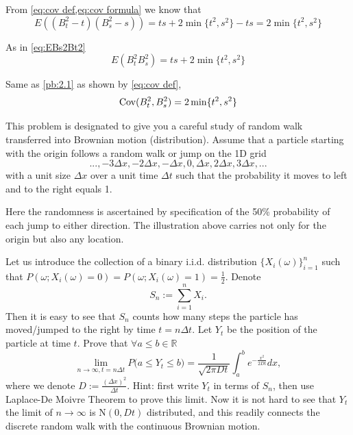     \begin{subproblem}
        \item\label{pb:2.1}
        From \cref{eq:cov def,eq:cov formula} we know that
        \[E\left((B_t^2-t)(B_s^2-s)\right)=ts+2\min\{t^2,s^2\}-ts=2\min\{t^2,s^2\}\]

        \item
        As in \cref{eq:EBs2Bt2}
        \[E\left(B_t^2B_s^2\right)=ts+2\min\{t^2,s^2\}\]

        \item
        Same as \ref{pb:2.1} as shown by \cref{eq:cov def},
        \[\mathrm{Cov}(B_t^2,B_s^2)=2\min\{t^2,s^2\}\]
    \end{subproblem}

    \problem
    \begin{question}
        This problem is designated to give you a careful study of random walk
        transferred into Brownian motion (distribution).  Assume that a particle
        starting with the origin follows a random walk or jump on the 1D grid 
        \[...,-3\Delta x, -2\Delta x, -\Delta x, 0,\Delta x,2\Delta x,3\Delta x,...\]
        with a unit size $\Delta x$ over a unit time $\Delta t$ such that 
        the probability it moves to left and to the right equals 1.
        
        Here the randomness is ascertained by specification of
        the 50\% probability of each jump to either direction. 
        The illustration above carries not only for the origin but also any location.


        Let us introduce the collection of a binary i.i.d. distribution
        $\{X_i(\omega)\}_{i=1}^n$ such that
        $P(\omega;X_i(\omega)=0)=P(\omega;X_i(\omega)=1)=\frac{1}{2}$.  Denote
        \[S_n:=\sum_{i=1}^n X_i.\]
        Then it is easy to see that $S_n$ counts how many steps
        the particle has moved/jumped to the right by time $t=n\Delta t$.
         Let $Y_t$ be the position of the particle at time $t$. 
         Prove that $\forall a\leq b\in\mathbb R$
        \[\lim_{n\rightarrow \infty, t=n\Delta t}P\big(a\leq Y_t\leq b\big)
        =\frac{1}{\sqrt{2\pi Dt}}\int_a^b e^{-\frac{x^2}{2Dt}}dx,\]
        where we denote $D:=\frac{(\Delta x)^2}{\Delta t}$. 
        Hint: first write $Y_t$ in terms of $S_n$, then use Laplace-De
        Moivre Theorem to prove this limit.  Now it is not hard to see
        that $Y_t$ the limit of $n\rightarrow\infty$ is N$(0,Dt)$ distributed,
        and this readily connects the discrete random walk with the continuous
        Brownian motion.
    \end{question}

